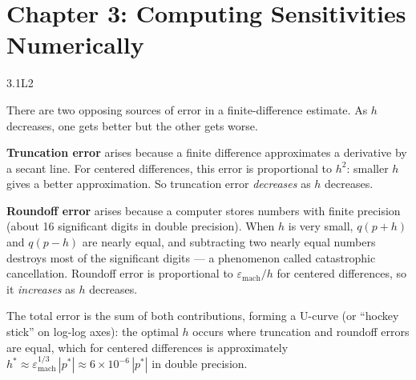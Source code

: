 
\section{Chapter 3: Computing Sensitivities Numerically}

\begin{solution}{3.1}{L2}

\solanswer

There are two opposing sources of error in a finite-difference estimate.
As $h$ decreases, one gets better but the other gets worse.

\textbf{Truncation error} arises because a finite difference approximates
a derivative by a secant line. For centered differences, this error
is proportional to $h^2$: smaller $h$ gives a better approximation.
So truncation error \emph{decreases} as $h$ decreases.

\textbf{Roundoff error} arises because a computer stores numbers with
finite precision (about 16 significant digits in double precision).
When $h$ is very small, $q(p+h)$ and $q(p-h)$ are nearly equal,
and subtracting two nearly equal numbers destroys most of the significant
digits — a phenomenon called catastrophic cancellation. Roundoff error
is proportional to $\varepsilon_{\text{mach}}/h$ for centered differences,
so it \emph{increases} as $h$ decreases.

The total error is the sum of both contributions, forming a U-curve
(or ``hockey stick'' on log-log axes): the optimal $h$ occurs where
truncation and roundoff errors are equal, which for centered differences
is approximately $h^* \approx \varepsilon_{\text{mach}}^{1/3}\,|p^*|
\approx 6\times 10^{-6}\,|p^*|$ in double precision.


\end{solution}

